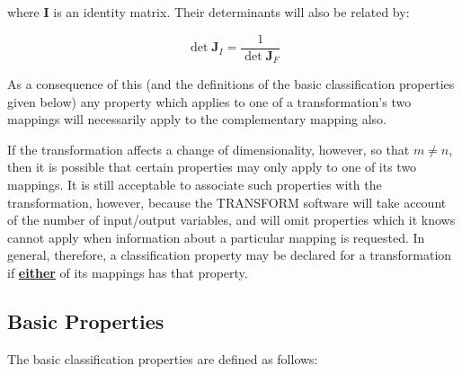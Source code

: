 \documentclass[twoside,11pt]{article}
\newcommand{\xlabel}[1]{}
\newcommand{\name}[1]{\mbox{\small{#1}}}
\begin{document}
where $\textbf{I}$ is an identity matrix.
Their determinants will also be related by:

\begin{equation}
\det{\textbf{J}_I} = \frac{1}{\det{\textbf{J}_F}}
\end{equation}

As a consequence of this (and the definitions of the basic classification
properties given below) any property which applies to one of a
transformation's two mappings will necessarily apply to the complementary
mapping also. 

If the transformation affects a change of dimensionality, however, so that
\mbox{$m \ne n$}, then it is possible that certain properties may only apply
to one of its two mappings. 
It is still acceptable to associate such properties with the transformation,
however, because the \name{TRANSFORM} software will take account of the
number of input/output variables, and will omit properties which it knows
cannot apply when information about a particular mapping is requested. 
In general, therefore, a classification property may be declared for a
transformation if \underline{\textbf{either}} of its mappings has that property. 


\subsection{\xlabel{basic_properties}Basic Properties}

The basic classification properties are defined as follows:
\end{document}
